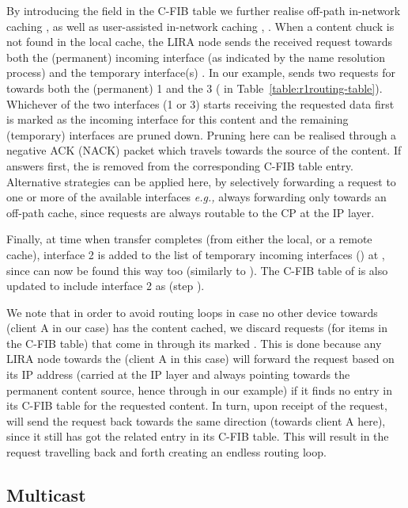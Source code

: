 \documentclass{sig-alternate}
\newcommand{\eg}{{\em e.g.,\/ }}
\begin{document}
By introducing the  field in the C-FIB table we further realise off-path in-network caching \cite{scan}, as well as user-assisted in-network caching \cite{userAssistedCaching}, \cite{sit-networking-sourlas}. When a content chuck is not found in the local cache, the LIRA node sends the received request towards both the (permanent) incoming interface  (as indicated by the name resolution process) and the temporary interface(s) . In our example,  sends two requests for  towards both the (permanent)  1 and the  3 ( in Table~\ref{table:r1routing-table}). Whichever of the two interfaces (1 or 3) starts receiving the requested data first is marked as the incoming interface for this content and the remaining (temporary) interfaces are pruned down. Pruning here can be realised through a negative ACK (NACK) packet which travels towards the source of the content. If  answers first, the  is removed from the corresponding C-FIB table entry. Alternative strategies can be applied here, by selectively forwarding a request to one or more of the available interfaces \eg always forwarding only towards an off-path cache, since requests are always routable to the CP at the IP layer.

Finally, at time  when  transfer completes (from either the local, or a remote cache), interface 2 is added to the list of temporary incoming interfaces () at , since  can now be found this way too (similarly to ). The C-FIB table of  is  also updated to include interface 2 as  (step ).

We note that in order to avoid routing loops in case no other device towards  (client A in our case) has the content cached, we discard requests (for items in the C-FIB table) that come in through its marked . This is done because any LIRA node towards the  (client A in this case) will forward the request based on its IP address (carried at the IP layer and always pointing towards the permanent content source, hence through  in our example) if it finds no entry in its C-FIB table for the requested content.
In turn, upon receipt of the request,  will send the request back towards the same direction (towards client A here), since it still has got the related entry in its C-FIB table. This will result in the request travelling back and forth creating an endless routing loop.


\subsection{Multicast}\label{multicast}
\end{document}
